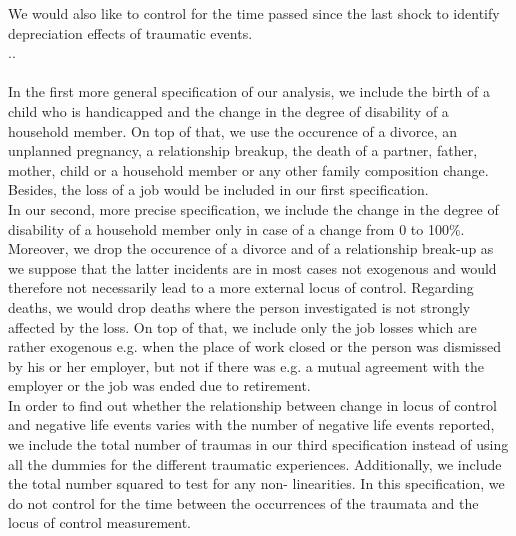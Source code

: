 \documentclass[12pt,a4paper,fleqn]{article}
\begin{document}
We would also like to control for the time passed since the last shock to
identify depreciation effects of traumatic events.\\
..\\
\\
In the first more general specification of our analysis, we include
the birth of a child who is handicapped and the change in the degree of
disability of a household member. On top of that, we use the occurence of a divorce, 
an unplanned pregnancy, a relationship breakup, the death of a partner, father, 
mother, child or a household member or
any other family composition change. Besides, the loss of a job would be included in our first specification. \\

In our second, more precise specification, we include the change in the degree of disability of a
household member only in case of a change from 0 to 100\%. Moreover, we drop the occurence
of a divorce and of a relationship break-up as we suppose
that the latter incidents are in most cases not exogenous and would therefore
not necessarily lead to a more external locus of control. Regarding
deaths, we would drop deaths where the person investigated is not strongly
affected by the loss. On top of that, we include
only the job losses which are rather exogenous e.g. when the place of work
closed or the person was dismissed by his or her employer, but not if there was
e.g. a mutual agreement with the employer or the job was ended due to
retirement.\\

In order to find out whether the relationship between change in locus of
control and negative life events varies with the number of negative life events
reported, we include the total number of traumas in our third specification
instead of using all the dummies for the different traumatic experiences. Additionally, we
include the total number squared to test for any non-
linearities. In this specification, we do not control for the time between the
occurrences of the traumata and the locus of control measurement.\\
\end{document}
